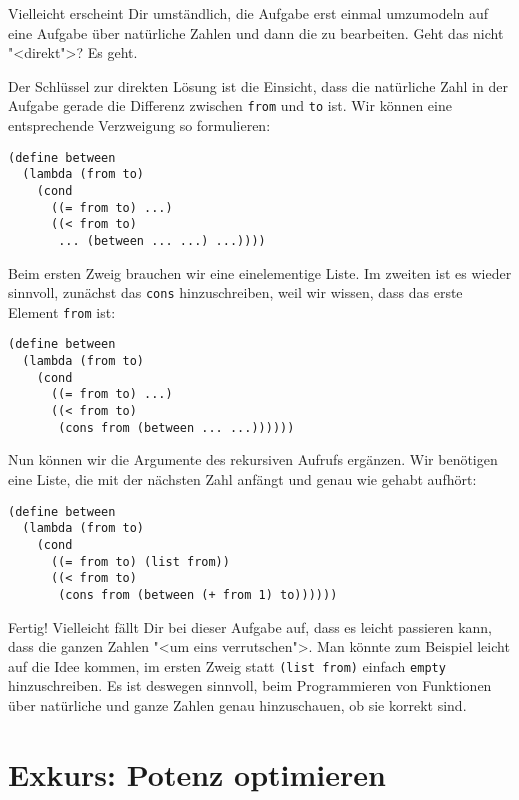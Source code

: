 Vielleicht erscheint Dir umständlich, die Aufgabe erst einmal
umzumodeln auf eine Aufgabe über natürliche Zahlen und dann die zu
bearbeiten.  Geht das nicht "<direkt">? Es geht.

Der Schlüssel zur direkten Lösung ist die Einsicht, dass die
natürliche Zahl in der Aufgabe gerade die Differenz zwischen
\lstinline{from} und \lstinline{to} ist.  Wir können eine
entsprechende Verzweigung so formulieren:
%
\begin{lstlisting}
(define between
  (lambda (from to)
    (cond
      ((= from to) ...)
      ((< from to)
       ... (between ... ...) ...))))
\end{lstlisting}
%
Beim ersten Zweig brauchen wir eine einelementige Liste.  Im zweiten
ist es wieder sinnvoll, zunächst das \lstinline{cons} hinzuschreiben,
weil wir wissen, dass das erste Element \lstinline{from} ist:
%
\begin{lstlisting}
(define between
  (lambda (from to)
    (cond
      ((= from to) ...)
      ((< from to)
       (cons from (between ... ...))))))
\end{lstlisting}
%
Nun können wir die Argumente des rekursiven Aufrufs ergänzen.  Wir
benötigen eine Liste, die mit der nächsten Zahl anfängt und genau wie
gehabt aufhört:
%
\begin{lstlisting}
(define between
  (lambda (from to)
    (cond
      ((= from to) (list from))
      ((< from to)
       (cons from (between (+ from 1) to))))))
\end{lstlisting}
%
Fertig!
Vielleicht fällt Dir bei dieser Aufgabe auf, dass es leicht passieren
kann, dass die ganzen Zahlen "<um eins verrutschen">.  Man könnte zum
Beispiel leicht auf die Idee kommen, im ersten Zweig statt
\lstinline{(list from)} einfach \lstinline{empty} hinzuschreiben.  Es
ist deswegen sinnvoll, beim Programmieren von Funktionen über
natürliche und ganze Zahlen genau hinzuschauen, ob sie korrekt sind.

\section{Exkurs: Potenz optimieren}

